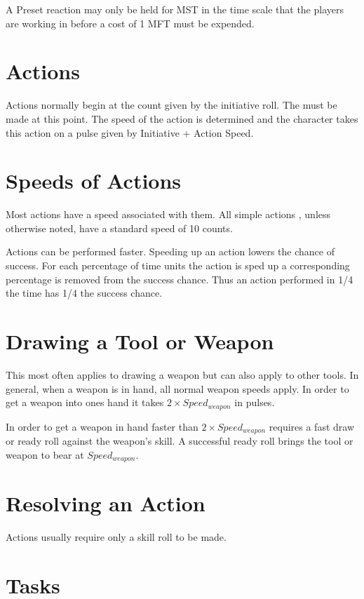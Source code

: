 A Preset reaction may only be held for MST in the time scale 
that the players are working in before a cost of 1 MFT must be 
expended.

\section{Actions}

Actions normally begin at the count given by the initiative roll. The 
must be made at this point. The speed of the action is determined and 
the character takes this action on a pulse given by Initiative +
Action Speed.  

\section{Speeds of Actions}

Most actions have a speed associated with them. All simple actions 
, unless otherwise noted, have a standard speed of 10 counts. 
 


Actions can be performed faster. Speeding up an action lowers the
chance of success. For each percentage of time units the action is 
sped up a corresponding percentage is removed from 
the success chance. Thus an action performed in 1/4 the time has
1/4 the success chance.

\section{Drawing a Tool or Weapon}

This most often applies to drawing a weapon but can also apply to 
other tools. In general, when a weapon is in hand, all normal weapon 
speeds apply. In order to get a weapon into ones hand it takes 
\( 2 \times Speed_{weapon} \) in pulses. 

In order to get a weapon in hand faster than \( 2 \times 
Speed_{weapon} \) requires a fast draw or ready roll against the weapon's 
skill. A successful ready roll brings the tool or weapon to bear at 
\( Speed_{weapon} \).  

\section{Resolving an Action}
Actions usually require only a skill roll to be made. 

\section{Tasks}

